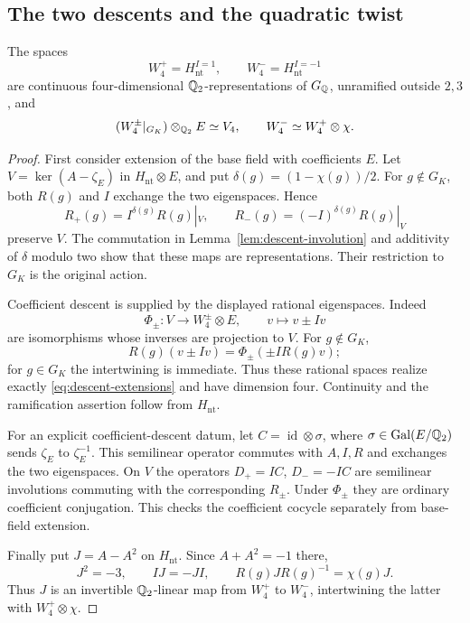 \subsection{The two descents and the quadratic twist}

\begin{theorem}\label{thm:descent-rational}
The spaces
\[
 W_4^+=H_{\mathrm{nt}}^{I=1},\qquad
 W_4^-=H_{\mathrm{nt}}^{I=-1}
\]
are continuous four-dimensional $\mathbb Q_2$-representations of $G_\mathbb Q$,
unramified outside $2,3$, and
\[
 (W_4^\pm|_{G_K})\otimes_{\mathbb Q_2}E\simeq V_4,
 \qquad W_4^-\simeq W_4^+\otimes\chi.
\]
\end{theorem}

\begin{proof}
First consider extension of the base field with coefficients $E$.
Let $V=\ker(A-\zeta_E)$ in $H_{\mathrm{nt}}\otimes E$, and put
$\delta(g)=(1-\chi(g))/2$. For $g\notin G_K$, both $R(g)$ and $I$
exchange the two eigenspaces. Hence
\begin{equation}\label{eq:descent-extensions}
 R_+(g)=I^{\delta(g)}R(g)|_V,\qquad
 R_-(g)=(-I)^{\delta(g)}R(g)|_V
\end{equation}
preserve $V$. The commutation in Lemma~\ref{lem:descent-involution}
and additivity of $\delta$ modulo two show that these maps are
representations. Their restriction to $G_K$ is the original action.

Coefficient descent is supplied by the displayed rational eigenspaces.
Indeed
\[
 \Phi_\pm:V\longrightarrow W_4^\pm\otimes E,
 \qquad v\longmapsto v\pm Iv
\]
are isomorphisms whose inverses are projection to $V$. For $g\notin G_K$,
\[
 R(g)(v\pm Iv)=\Phi_\pm(\pm IR(g)v);
\]
for $g\in G_K$ the intertwining is immediate. Thus these rational
spaces realize exactly \eqref{eq:descent-extensions} and have dimension
four. Continuity and the ramification assertion follow from $H_{\mathrm{nt}}$.

For an explicit coefficient-descent datum, let
$C=\operatorname{id}\otimes\sigma$, where
$\sigma\in\operatorname{Gal}(E/\mathbb Q_2)$ sends $\zeta_E$ to $\zeta_E^{-1}$.
This semilinear operator commutes with $A,I,R$ and exchanges the
two eigenspaces. On $V$ the operators $D_+=IC$, $D_-=-IC$ are
semilinear involutions commuting with the corresponding $R_\pm$.
Under $\Phi_\pm$ they are ordinary coefficient conjugation. This
checks the coefficient cocycle separately from base-field extension.

Finally put $J=A-A^2$ on $H_{\mathrm{nt}}$. Since $A+A^2=-1$ there,
\[
 J^2=-3,\qquad IJ=-JI,\qquad R(g)JR(g)^{-1}=\chi(g)J.
\]
Thus $J$ is an invertible $\mathbb Q_2$-linear map from $W_4^+$ to $W_4^-$,
intertwining the latter with $W_4^+\otimes\chi$.
\end{proof}

